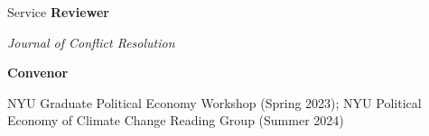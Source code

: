 \documentclass{resume} %
\begin{document}
\begin{rSection}{Service}
    \textbf{Reviewer}

    \hspace*{0.5em} \textit{Journal of Conflict Resolution}

    \textbf{Convenor}

    \hspace*{0.5em} NYU Graduate Political Economy Workshop (Spring 2023); NYU Political Economy of Climate Change Reading Group (Summer 2024)
    
\end{rSection}
\end{document}
